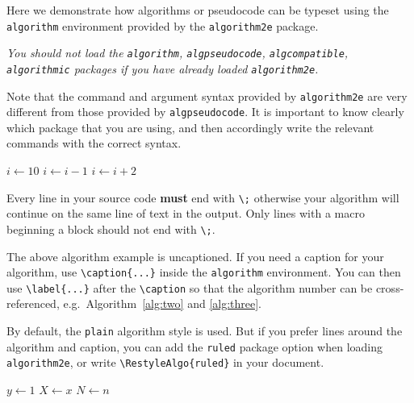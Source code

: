 \documentclass[11pt]{article}
\begin{document}
Here we demonstrate how algorithms or pseudocode can be typeset using the \verb|algorithm| environment provided by the \verb|algorithm2e| package.

    {\itshape You should not load the \verb|algorithm|, \verb|algpseudocode|, \verb|algcompatible|, \verb|algorithmic| packages if you have already loaded \verb|algorithm2e|.}

Note that the command and argument syntax provided by \verb|algorithm2e| are very different from those provided by \verb|algpseudocode|. It is important to know clearly which package that you are using, and then accordingly write the relevant commands with the correct syntax.

\begin{algorithm}
    $i\gets 10$\;
    {
        $i\gets i-1$\;
    }{
        {
            $i\gets i+2$\;
        }
    }
\end{algorithm}

Every line in your source code \textbf{must} end with \verb|\;| otherwise your algorithm will continue on the same line of text in the output. Only lines with a macro beginning a block should not end with \verb|\;|.

The above algorithm example is uncaptioned. If you need a caption for your algorithm, use \verb|\caption{...}| inside the \verb|algorithm| environment.
You can then use \verb|\label{...}| after the \verb|\caption| so that the algorithm number can be cross-referenced, e.g.~Algorithm~\ref{alg:two} and \ref{alg:three}.

By default, the \verb|plain| algorithm style is used. But if you prefer lines around the algorithm and caption, you can add the \verb|ruled| package option when loading \verb|algorithm2e|, or write \verb|\RestyleAlgo{ruled}| in your document.


{}

\begin{algorithm}[hbt!]
    \caption{An algorithm with caption}\label{alg:two}
    $y \gets 1$\;
    $X \gets x$\;
    $N \gets n$\;
\end{algorithm}
\end{document}
